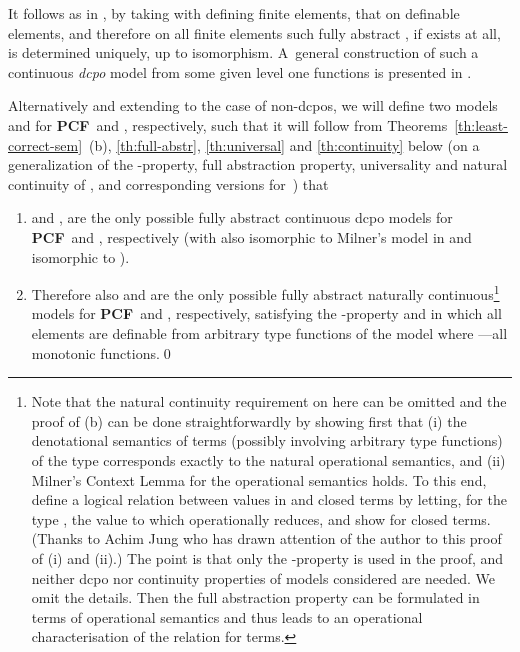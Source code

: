 \documentclass[fleqn]{LMCS}
\theoremstyle{plain}\newtheorem{satz}[thm]{Satz}
\theoremstyle{plain}\newtheorem{hyp}[thm]{Hypothesis}
\theoremstyle{plain}\newtheorem{hyps}[thm]{Hypotheses}
\theoremstyle{definition}\newtheorem{note}[thm]{Note}
\newcommand{\PCF}{\mbox{\bf PCF}}
\newcommand{\?}{\mbox{?}}
\begin{document}
\noindent
It follows as in \cite{Milner77}, by taking  
with  defining finite elements, that on definable elements, 
and therefore on all finite elements such fully abstract , if exists at all, 
is determined uniquely, up to isomorphism. A~general construction of such a 
continuous \emph{dcpo} model from some given level one functions is presented 
in \cite{Milner77}. 

Alternatively and extending to the case of non-dcpos, we will define 
two models  and  
for \PCF\ and , respectively, 
such that it will follow from 
Theorems~\ref{th:least-correct-sem}~(b), 
\ref{th:full-abstr}, \ref{th:universal} and \ref{th:continuity} below 
(on a generalization of the -property, 
full abstraction property, universality and natural continuity of , 
and corresponding versions for~) that 

\begin{thm}\label{th:UNIQUE}\hfill
\begin{enumerate}[\em(a)]
\item  and , 
are the only possible  
fully abstract 
continuous dcpo models for \PCF\ and , respectively 
(with  also isomorphic to Milner's model in \cite{Milner77} 
and  isomorphic to ). 

\item Therefore also  and  are the only possible 
fully abstract naturally continuous\footnote{Note that the natural continuity requirement on  here 
can be omitted and the proof of (b) can be done straightforwardly 
by showing first that (i) the denotational semantics of  terms 
(possibly involving arbitrary type  functions)
of the type  corresponds exactly to the natural operational semantics, 
and (ii) Milner's Context Lemma \cite{Milner77} for the operational 
semantics holds. 
To this end, define a logical relation 
between values  in  and closed  terms  
by letting, for the type , 
 the value to which  
operationally reduces, and show  for closed terms. 
(Thanks to Achim Jung who has drawn attention of the author 
to this proof of (i) and (ii).) 
The point is that only the -property is used 
in the proof, and neither dcpo nor continuity properties 
of models considered are needed. We omit the details. 
Then the full abstraction property can be formulated in terms of operational 
semantics and thus leads to an 
operational characterisation of the relation  
for  terms. 
}
models for \PCF\ and , respectively, satisfying the -property and
in which all elements are definable 
from arbitrary type  functions of the model 
where 
---all monotonic functions.\qed
\end{enumerate}

\end{thm}
\end{document}
